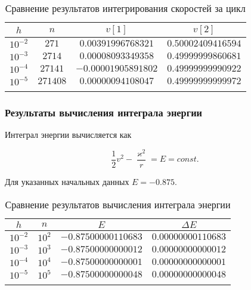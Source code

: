 \begin{frame}

\begin{table}[h]
  \centering
  \caption{Сравнение результатов интегрирования скоростей за цикл}
  \begin{tabular}{cccc}
    \toprule
    $ h $ &
    $ n $ &
    $ v[1] $ &
    $ v[2] $ \\
    \midrule
    $ 10^{-2} $ & $ 271 $ & $ 0.00391996768321 $ & $ 0.50002409416594 $ \\
    \arrayrulecolor{black!40}
    \midrule
    $ 10^{-3} $ & $ 2714 $ & $ 0.00008093349358 $ & $ 0.49999999860681 $ \\
    \midrule
    $ 10^{-4} $ & $ 27141 $ & $ -0.00001905891802 $ & $ 0.49999999990922 $ \\
    \midrule
    $ 10^{-5} $ & $ 271408 $ & $ 0.00000094108047 $ & $ 0.49999999999972 $ \\
    \arrayrulecolor{black}
    \bottomrule
  \end{tabular}
\end{table}

\end{frame}

\begin{frame}
\frametitle{Результаты вычисления интеграла энергии}

Интеграл энергии вычисляется как

\su
\begin{equation}
  \frac{1}{2} v^2 - \frac{\varkappa^2}{r} = E = const.
\end{equation}

Для указанных начальных данных $ E = -0.875 $.

\begin{table}[h]
  \centering
  \caption{Сравнение результатов вычисления интеграла энергии}
  \begin{tabular}{cccc}
    \toprule
    $ h $ &
    $ n $ &
    $ E $ &
    $ \Delta E $ \\
    \midrule
    $ 10^{-2} $ & $ 10^2 $ & $ -0.87500000110683 $ & $ 0.00000000110683 $ \\
    \arrayrulecolor{black!40}
    \midrule
    $ 10^{-3} $ & $ 10^3 $ & $ -0.87500000000012 $ & $ 0.00000000000012 $ \\
    \midrule
    $ 10^{-4} $ & $ 10^4 $ & $ -0.87500000000001 $ & $ 0.00000000000001 $ \\
    \midrule
    $ 10^{-5} $ & $ 10^5 $ & $ -0.87500000000048 $ & $ 0.00000000000048 $ \\
    \arrayrulecolor{black}
    \bottomrule
  \end{tabular}
\end{table}

\end{frame}

